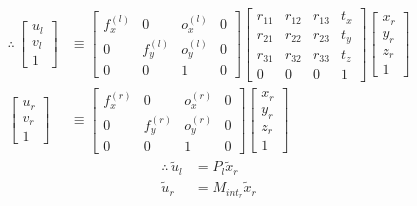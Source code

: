 \begin{align*}
    \therefore \, 
    \begin{bmatrix}
        u_{l} \\
        v_{l} \\
        1
    \end{bmatrix}&\equiv\begin{bmatrix}
        f_{x}^{(l)} & 0 & o_{x}^{(l)} & 0\\
        0 & f_{y}^{(l)} & o_{y}^{(l)} & 0\\
        0 & 0 & 1&0
    \end{bmatrix}\begin{bmatrix}
        r_{11} & r_{12} & r_{13} & t_x\\
        r_{21} & r_{22} & r_{23} & t_y\\
        r_{31} & r_{32} & r_{33} & t_z\\
        0&0&0&1
    \end{bmatrix}
    \begin{bmatrix}
        x_{r} \\
        y_{r} \\
        z_{r} \\
        1
    \end{bmatrix}\\
    \begin{bmatrix}
        u_{r} \\
        v_{r} \\
        1
    \end{bmatrix}&\equiv\begin{bmatrix}
        f_{x}^{(r)} & 0 & o_{x}^{(r)} & 0\\
        0 & f_{y}^{(r)} & o_{y}^{(r)} & 0\\
        0 & 0 & 1 & 0
    \end{bmatrix}\begin{bmatrix}
        x_{r} \\
        y_{r} \\
        z_{r} \\
        1
    \end{bmatrix}
\end{align*}
\begin{align*}
    \therefore \, \tilde{u}_l&=P_l\tilde{x}_r\\
    \tilde{u}_r&=M_{{int}_r}\tilde{x}_r\\
\end{align*}
